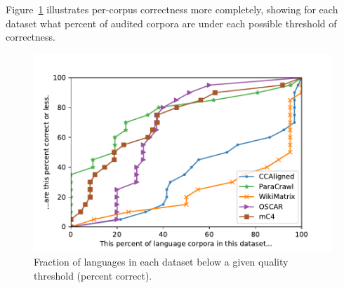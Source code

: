 Figure~\ref{fig:ratio_c} illustrates per-corpus correctness more completely, showing for each dataset what percent of audited corpora are under each possible threshold of correctness.

\begin{figure}[th!]
    \centering
    \includegraphics[width=\columnwidth]{static/media/oscar/quality/num_C_ratio.pdf}
    \caption{Fraction of languages in each dataset below a given quality threshold (percent correct).}%
    \label{fig:ratio_c}
\end{figure}

